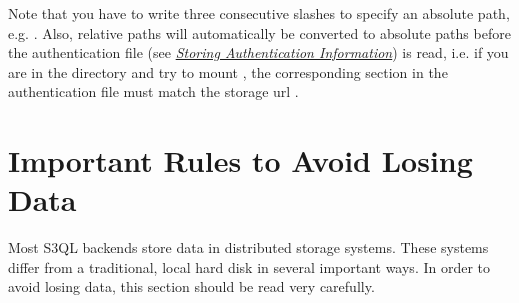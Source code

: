 \documentclass[letterpaper,10pt,english]{sphinxmanual}
\begin{document}
Note that you have to write three consecutive slashes to specify an
absolute path, e.g. . Also, relative paths will
automatically be converted to absolute paths before the authentication
file (see {\hyperref[authinfo:authinfo]{\emph{Storing Authentication Information}}}) is read, i.e. if you are in the
 directory and try to mount , the
corresponding section in the authentication file must match the
storage url .


\chapter{Important Rules to Avoid Losing Data}
\label{durability:important-rules-to-avoid-losing-data}\label{durability::doc}\label{durability:durability}
Most S3QL backends store data in distributed storage systems. These
systems differ from a traditional, local hard disk in several
important ways. In order to avoid losing data, this section should be
read very carefully.
\end{document}
